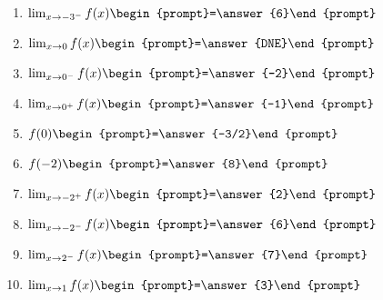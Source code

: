 \documentclass{ximera}
\begin{document}
\begin{question}
\begin{enumerate}
\item $\lim_{x\to -3^-} f(x) \begin{prompt}=\answer{6}\end{prompt}$   
\item $\lim_{x\to 0} f(x) \begin{prompt}=\answer{DNE}\end{prompt}$ 
\item $\lim_{x\to 0^-} f(x) \begin{prompt}=\answer{-2}\end{prompt}$  
\item $\lim_{x\to 0^+} f(x) \begin{prompt}=\answer{-1}\end{prompt}$  
\item $f(0) \begin{prompt}=\answer{-3/2}\end{prompt}$ 
\item $f(-2) \begin{prompt}=\answer{8}\end{prompt}$ 
\item $\lim_{x\to -2^+} f(x) \begin{prompt}=\answer{2}\end{prompt}$
\item $\lim_{x\to -2^-} f(x) \begin{prompt}=\answer{6}\end{prompt}$   
\item $\lim_{x\to 2^-} f(x) \begin{prompt}=\answer{7}\end{prompt}$  
\item $\lim_{x\to 1} f(x) \begin{prompt}=\answer{3}\end{prompt}$  



\end{enumerate}
\end{question}
\end{document}
